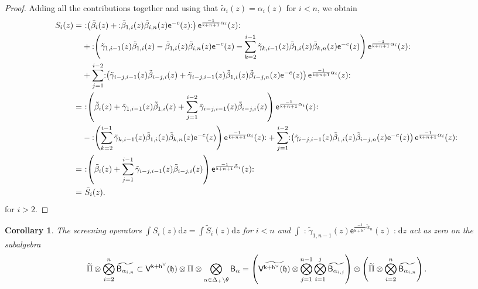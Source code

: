 \documentclass[10pt,a4paper]{amsart}
\numberwithin{equation}{section}
\newcommand{\dd}{\mathrm{d}}   %
\newcommand{\ee}{\mathsf{e}}   %
\newcommand{\kk}{\mathsf{k}}   %
\DeclarePairedDelimiter{\brac}{\lparen}{\rparen}   %
\newcommand{\no}[1]{\mathopen{:} #1 \mathclose{:}} %
\newcommand{\VOA}[1]{\mathsf{#1}}    %
\newcommand{\cartan}{\mathfrak{h}}
\newcommand{\cox}{\mathsf{h}}                                        %
\newcommand{\dcox}{\coroot{\cox}}                                    %
\newcommand{\proots}{\Delta_+}                                       %
\newcommand{\sroot}[1]{\alpha_{#1}}                                  %
\newcommand{\tsroot}[1]{\tilde{\alpha}_{#1}}                         %
\newcommand{\hroot}{\theta}                                          %
\newcommand{\coroot}[1]{#1^{\vee}}                                   %
\newcommand{\uaffvoa}[2]{\VOA{V}^{#1}\brac{#2}}                   %
\newcommand{\bgvoa}{\VOA{B}}                                      %
\theoremstyle{plain}
\newtheorem{corollary}[theorem]{Corollary}
\begin{document}
\begin{proof}
    Adding all the contributions together and using that $\tilde{\alpha}_i(z) = \alpha_i(z)$ for $i<n$, we obtain
    \begin{align}
        S_i(z) =&\ \no{\left( \tilde{\beta}_i(z)+\no{\tilde{\beta}_{1,i} (z) \tilde{\beta}_{i,n}(z)\ee^{-c}(z)}\right) \ee^{\frac{-1}{\kk+n+1} \alpha_i}(z) }\\
        &+  \no{\left(\tilde{\gamma}_{1,i-1}(z)\tilde{\beta}_{1,i}(z) -\tilde{\beta}_{1,i}(z) \tilde{\beta}_{i,n}(z)\ee^{-c}(z)
        - \sum_{k=2}^{i-1} \tilde{\gamma}_{k,i-1}(z)\tilde{\beta}_{1,i}(z) \tilde{\beta}_{k,n}(z)\ee^{-c}(z) \right) \ee^{\frac{-1}{\kk+n+1} \alpha_i}(z) }\notag\\
        &+ \sum_{j=1}^{i-2} \no{ \left( \tilde{\gamma}_{i-j,i-1}(z) \tilde{\beta}_{i-j,i}(z)+ \tilde{\gamma}_{i-j,i-1}(z)\tilde{\beta}_{1,i} (z) \tilde{\beta}_{i-j,n}(z)\ee^{-c}(z) \right) \ee^{\frac{-1}{\kk+n+1} \alpha_i}(z) }\notag\\
        =&\ \no{\left(\tilde{\beta}_i(z)+\tilde{\gamma}_{1,i-1}(z)\tilde{\beta}_{1,i}(z)+ \sum_{j=1}^{i-2} \tilde{\gamma}_{i-j,i-1}(z) \tilde{\beta}_{i-j,i}(z)\right) \ee^{\frac{-1}{\kk+n+1} \alpha_i}(z) }\notag\\
        &-  \no{\left( \sum_{k=2}^{i-1} \tilde{\gamma}_{k,i-1}(z)\tilde{\beta}_{1,i}(z) \tilde{\beta}_{k,n}(z)\ee^{-c}(z) \right) \ee^{\frac{-1}{\kk+n+1} \alpha_i}(z) }
        + \sum_{j=1}^{i-2} \no{ \left(  \tilde{\gamma}_{i-j,i-1}(z)\tilde{\beta}_{1,i} (z) \tilde{\beta}_{i-j,n}(z)\ee^{-c}(z) \right) \ee^{\frac{-1}{\kk+n+1} \alpha_i}(z) }\notag\\
        =&\ \no{\left(\tilde{\beta}_i(z)+ \sum_{j=1}^{i-1} \tilde{\gamma}_{i-j,i-1}(z) \tilde{\beta}_{i-j,i}(z)\right) \ee^{\frac{-1}{\kk+n+1} \tilde{\alpha}_i}(z) }\notag\\
        =&\ \tilde{S}_i(z). \notag
    \end{align}
    for $i>2$.
\end{proof}

\begin{corollary}
The screening operators $\int S_i(z) \dd z =\int \tilde{S}_i(z) \dd z $ for $i<n$ and $\int \no{\tilde{\gamma}_{1,n-1}(z) \ee^{\frac{-1}{\kk+\dcox} \tsroot{n}}(z)} \dd z $ act as zero on the subalgebra
%
\begin{equation}
    \widetilde{\Pi} \otimes \bigotimes_{i=2}^{n} \widetilde{\bgvoa_{\sroot{i,n}}} \subset \uaffvoa{\kk+\dcox}{\cartan} \otimes \Pi \otimes \bigotimes_{\alpha \in \proots \setminus \hroot} \bgvoa_\alpha = \left( \widetilde{\uaffvoa{\kk+\dcox}{\cartan}} \otimes \bigotimes_{j=1}^{n-1}\bigotimes_{i=1}^{j} \widetilde{\bgvoa_{\sroot{i,j}}} \right) \otimes \left( \widetilde{\Pi} \otimes \bigotimes_{i=2}^{n} \widetilde{\bgvoa_{\sroot{i,n}}} \right).
\end{equation}
%
\end{corollary}
\end{document}
